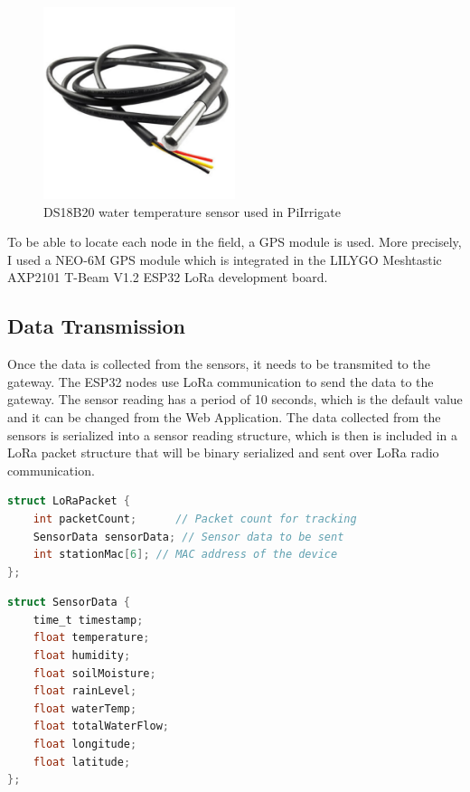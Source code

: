 \begin{figure}[H]
    \centering
    \includegraphics[width=0.5\textwidth]{images/water-temp.png}
    \caption{DS18B20 water temperature sensor used in PiIrrigate}
    \label{fig:ds18b20}
\end{figure}

To be able to locate each node in the field, a GPS module is used. More precisely, I used a NEO-6M GPS module
which is integrated in the LILYGO Meshtastic AXP2101 T-Beam V1.2 ESP32 LoRa development board.

\subsection {Data Transmission}
Once the data is collected from the sensors, it needs to be transmited to the gateway.
The ESP32 nodes use LoRa communication to send the data to the gateway. 
The sensor reading has a period of 10 seconds, which is the default value and it can be changed from the Web Application.
The data collected from the sensors is serialized into a sensor reading structure, 
which is then is included in a LoRa packet structure that will be 
binary serialized and sent over LoRa radio communication.
\begin{lstlisting}[language=C, caption={LoRa packet structure}]
struct LoRaPacket {
    int packetCount;      // Packet count for tracking
    SensorData sensorData; // Sensor data to be sent
    int stationMac[6]; // MAC address of the device
};
\end{lstlisting}

\begin{lstlisting}[language=C, caption={Sensor reading structure}]
struct SensorData {
    time_t timestamp;
    float temperature;
    float humidity;
    float soilMoisture;
    float rainLevel;
    float waterTemp;
    float totalWaterFlow;
    float longitude;
    float latitude;
};
\end{lstlisting}

